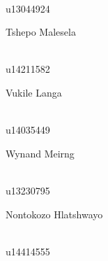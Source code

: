 \documentclass[a4paper,12pt]{report}
\begin{document}
\begin{titlepage}
\begin{center}
\begin{minipage}{0.4\textwidth}
\begin{flushright} \large
\emph{} \\
u13044924
\end{flushright}
\end{minipage}
\begin{minipage}{0.4\textwidth}
\begin{flushleft} \large
Tshepo {Malesela}
\end{flushleft}
\end{minipage}
\begin{minipage}{0.4\textwidth}
\begin{flushright} \large
\emph{} \\
u14211582
\end{flushright}
\end{minipage}
\begin{minipage}{0.4\textwidth}
\begin{flushleft} \large
Vukile {Langa}
\end{flushleft}
\end{minipage}
\begin{minipage}{0.4\textwidth}
\begin{flushright} \large
\emph{} \\
u14035449
\end{flushright}
\end{minipage}
\begin{minipage}{0.4\textwidth}
\begin{flushleft} \large
Wynand {Meirng}
\end{flushleft}
\end{minipage}
\begin{minipage}{0.4\textwidth}
\begin{flushright} \large
\emph{} \\
u13230795
\end{flushright}
\end{minipage}
\begin{minipage}{0.4\textwidth}
\begin{flushleft} \large
Nontokozo {Hlatshwayo}
\end{flushleft}
\end{minipage}
\begin{minipage}{0.4\textwidth}
\begin{flushright} \large
\emph{} \\
u14414555
\end{flushright}
\end{minipage}

\end{center}
\end{titlepage}
\end{document}
